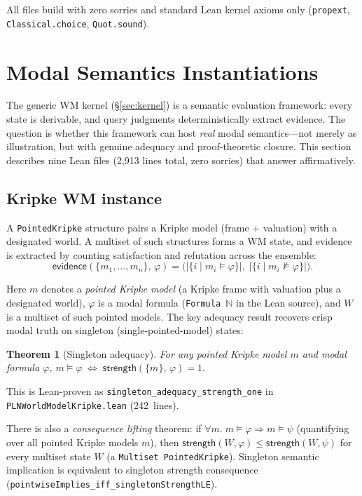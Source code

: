\documentclass[]{article}
\newtheorem{theorem}{Theorem}
\newcommand{\code}[1]{\texttt{#1}}
\newcommand{\Strength}{\mathsf{strength}}
\newcommand{\ev}{\mathsf{evidence}}
\begin{document}
All files build with zero sorries and standard Lean kernel axioms only
(\code{propext}, \code{Classical.choice}, \code{Quot.sound}).


\section{Modal Semantics Instantiations}
\label{sec:modal}

The generic WM kernel (\S\ref{sec:kernel}) is a semantic evaluation
framework: every state is derivable, and query judgments deterministically
extract evidence. The question is whether this framework can host
\emph{real} modal semantics---not merely as illustration, but with genuine
adequacy and proof-theoretic closure. This section describes nine Lean
files (2{,}913 lines total, zero sorries) that answer affirmatively.


\subsection{Kripke WM instance}
\label{sec:kripke-wm}

A \code{PointedKripke} structure pairs a Kripke model (frame + valuation)
with a designated world. A multiset of such structures forms a WM state,
and evidence is extracted by counting satisfaction and refutation across
the ensemble:
\[
  \ev(\{m_1,\ldots,m_n\},\,\varphi)
  = \bigl(|\{i \mid m_i \models \varphi\}|,\;
         |\{i \mid m_i \not\models \varphi\}|\bigr).
\]

Here $m$ denotes a \emph{pointed Kripke model} (a Kripke frame with
valuation plus a designated world), $\varphi$ is a modal formula
(\code{Formula~$\mathbb{N}$} in the Lean source), and $W$ is a multiset
of such pointed models.
The key adequacy result recovers crisp modal truth on singleton
(single-pointed-model) states:

\begin{theorem}[Singleton adequacy]
\label{thm:singleton-kripke}
For any pointed Kripke model $m$ and modal formula $\varphi$,
$m \models \varphi \;\iff\; \Strength(\{m\},\,\varphi) = 1.$
\end{theorem}

\noindent
This is Lean-proven as \code{singleton\_adequacy\_strength\_one} in
\code{PLNWorldModelKripke.lean} (242~lines).

There is also a \emph{consequence lifting} theorem: if
$\forall m.\;m \models \varphi \Rightarrow m \models \psi$ (quantifying
over all pointed Kripke models $m$), then
$\Strength(W,\varphi) \le \Strength(W,\psi)$ for every multiset state
$W$ (a \code{Multiset PointedKripke}).
Singleton semantic implication is equivalent to singleton strength
consequence (\code{pointwiseImplies\_iff\_singletonStrengthLE}).
\end{document}

